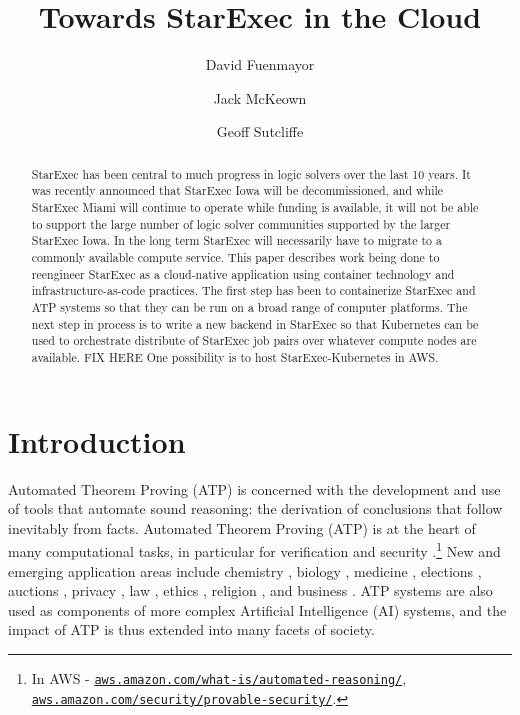 \documentclass{easychair}
\title{Towards StarExec in the Cloud}
\author{
  David Fuenmayor\inst{1}
\and
  Jack McKeown\inst{2}
\and
  Geoff Sutcliffe\inst{2}
}
\institute{
  University of Bamberg,
  Bamberg, Germany\\
  \email{david.fuenmayor@uni-bamberg.de}
\and
  University of Miami,
  Miami, USA\\
  \email{jam771@miami.edu,geoff@cs.miami.edu}
}
\begin{document}
\maketitle

\begin{abstract}
StarExec has been central to much progress in logic solvers over the last 10 years.
It was recently announced that StarExec Iowa will be decommissioned, and while StarExec Miami 
will continue to operate while funding is available, it will not be able to support the large 
number of logic solver communities supported by the larger StarExec Iowa. 
In the long term StarExec will necessarily have to migrate to a commonly available compute 
service. 
This paper describes work being done to reengineer StarExec as a cloud-native application using
container technology and infrastructure-as-code practices.
The first step has been to containerize StarExec and ATP systems so that they can be run on a 
broad range of computer platforms. 
The next step in process is to write a new backend in StarExec so that Kubernetes can be used to 
orchestrate distribute of StarExec job pairs over whatever compute nodes are available.
FIX HERE One possibility is to host StarExec-Kubernetes in AWS.
\end{abstract}
\section{Introduction}
\label{Introduction}

Automated Theorem Proving (ATP) is concerned with the development and use of tools that automate 
sound reasoning: the derivation of conclusions that follow inevitably from facts.
Automated Theorem Proving (ATP) is at the heart of many computational tasks, in particular for
verification \cite{Har06,HH19} and security \cite{Coo18}.\footnote{%
In AWS -
\href{https://aws.amazon.com/what-is/automated-reasoning/}{\tt aws.amazon.com/what-is/automated-reasoning/}, 
\href{https://aws.amazon.com/security/provable-security//}{\tt aws.amazon.com/security/provable-security/}.} 
New and emerging application areas include
chemistry \cite{Yad17}, 
biology \cite{CC+13}, 
medicine \cite{HLB05},
elections \cite{Nip09,BDS17}, 
auctions \cite{CK+15}, 
privacy \cite{Lib20},
law \cite{PS15}, 
ethics \cite{DF+16}, 
religion \cite{OZ11,BW14-ECAI,Hor19},
and business \cite{Han98}.
ATP systems are also used as components of more complex Artificial Intelligence (AI) systems,
and the impact of ATP is thus extended into many facets of society.
\end{document}
